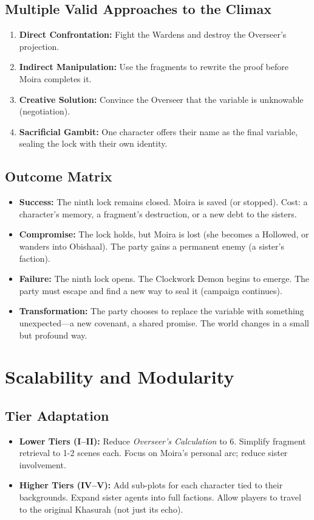 \documentclass[11pt]{article}
\begin{document}
\subsection{Multiple Valid Approaches to the Climax}
\begin{enumerate}
    \item \textbf{Direct Confrontation:} Fight the Wardens and destroy the Overseer's projection.
    \item \textbf{Indirect Manipulation:} Use the fragments to rewrite the proof before Moira completes it.
    \item \textbf{Creative Solution:} Convince the Overseer that the variable is unknowable (negotiation).
    \item \textbf{Sacrificial Gambit:} One character offers their name as the final variable, sealing the lock with their own identity.
\end{enumerate}

\subsection{Outcome Matrix}
\begin{itemize}
    \item \textbf{Success:} The ninth lock remains closed. Moira is saved (or stopped). Cost: a character's memory, a fragment's destruction, or a new debt to the sisters.
    \item \textbf{Compromise:} The lock holds, but Moira is lost (she becomes a Hollowed, or wanders into Obishaal). The party gains a permanent enemy (a sister's faction).
    \item \textbf{Failure:} The ninth lock opens. The Clockwork Demon begins to emerge. The party must escape and find a new way to seal it (campaign continues).
    \item \textbf{Transformation:} The party chooses to replace the variable with something unexpected---a new covenant, a shared promise. The world changes in a small but profound way.
\end{itemize}

\section{Scalability and Modularity}

\subsection{Tier Adaptation}
\begin{itemize}
    \item \textbf{Lower Tiers (I--II):} Reduce \textit{Overseer's Calculation} to 6. Simplify fragment retrieval to 1-2 scenes each. Focus on Moira's personal arc; reduce sister involvement.
    \item \textbf{Higher Tiers (IV--V):} Add sub-plots for each character tied to their backgrounds. Expand sister agents into full factions. Allow players to travel to the original Khasurah (not just its echo).
\end{itemize}
\end{document}
